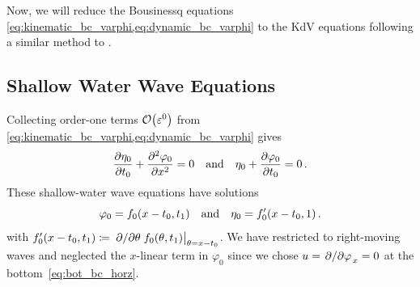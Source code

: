 \documentclass{jfm}
\renewcommand*{\epsilon}{\varepsilon}
\begin{document}
Now, we will reduce the Bousinessq equations
\cref{eq:kinematic_bc_varphi,eq:dynamic_bc_varphi} to the KdV equations
following a similar method to \citet{mei2005nonlinear}.
\subsection{Shallow Water Wave Equations}
Collecting order-one terms $\order{\epsilon^0}$ from
\cref{eq:kinematic_bc_varphi,eq:dynamic_bc_varphi} gives
\begin{equation}
  \pdv{\eta_0}{t_0} + \pdv[2]{\varphi_0}{x} = 0 \qq{and}
  \eta_0 + \pdv{\varphi_0}{t_0} = 0 \,.
\end{equation}
These shallow-water wave equations have solutions
\begin{equation}
  \varphi_0 = f_0(x-t_0,t_1) \qq{and} \eta_0 = f'_0(x-t_0,1) \,.
  \label{eq:order0_sols}
\end{equation}
with $f_0'(x-t_0,t_1) \coloneqq \eval{\pdv*{\theta}
f_0(\theta,t_1)}_{\theta = x-t_0}$.
We have restricted to right-moving waves and neglected the $x$-linear
term in $\varphi_0$ since we chose $u = \pdv*{\varphi}_x = 0$ at the
bottom~\cref{eq:bot_bc_horz}.
\end{document}
